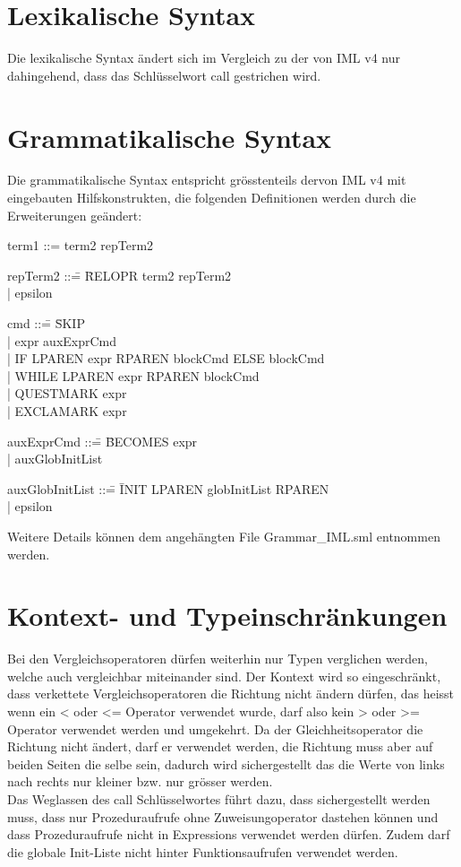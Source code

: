 \documentclass[a4paper,10pt]{article}
\begin{document}
\section{Lexikalische Syntax}
Die lexikalische Syntax \"andert sich im Vergleich zu der von IML v4
nur dahingehend, dass das Schl\"usselwort call gestrichen wird.
\section{Grammatikalische Syntax}
Die grammatikalische Syntax entspricht gr\"osstenteils dervon IML v4 mit eingebauten Hilfskonstrukten, die folgenden Definitionen werden durch die Erweiterungen ge\"andert:

\begin{tabbing}
term1 ::= term2 repTerm2
\end{tabbing}
\begin{tabbing}
repTerm2 ::\= = \= RELOPR term2 repTerm2\\
\> |\> epsilon
\end{tabbing}
\begin{tabbing}
cmd ::\= = \= SKIP\\
\> |\> expr auxExprCmd\\
\> |\> IF LPAREN expr RPAREN blockCmd ELSE blockCmd\\
\> |\> WHILE LPAREN expr RPAREN blockCmd\\
\> |\> QUESTMARK expr\\
\> |\> EXCLAMARK expr\\
\end{tabbing}
\begin{tabbing}
auxExprCmd ::\= = \= BECOMES expr\\
\> |\> auxGlobInitList\\
\end{tabbing}
\begin{tabbing}
auxGlobInitList ::\= = \= INIT LPAREN globInitList RPAREN\\
\> |\> epsilon\\
\end{tabbing}
Weitere Details k\"onnen dem angeh\"angten File Grammar\_IML.sml entnommen werden. 
\section{Kontext- und Typeinschr\"ankungen}
Bei den Vergleichsoperatoren d\"urfen weiterhin nur Typen verglichen werden, welche auch vergleichbar miteinander sind. Der Kontext wird so
eingeschr\"ankt, dass verkettete Vergleichsoperatoren die Richtung nicht \"andern d\"urfen, das heisst wenn ein < oder <= Operator verwendet wurde, darf also kein > oder >= Operator verwendet werden und umgekehrt. Da der Gleichheitsoperator die Richtung nicht \"andert, darf er verwendet werden, die Richtung muss aber auf beiden Seiten die selbe sein, dadurch wird sichergestellt das die Werte von links nach rechts nur kleiner bzw. nur gr\"osser werden.\\
Das Weglassen des call Schl\"usselwortes f\"uhrt dazu, dass
sichergestellt werden muss, dass nur Prozeduraufrufe ohne 
Zuweisungoperator dastehen k\"onnen und dass Prozeduraufrufe nicht in
Expressions verwendet werden d\"urfen. Zudem darf die globale
Init-Liste nicht hinter Funktionsaufrufen verwendet werden. 
\end{document}
